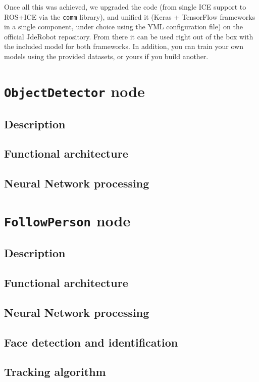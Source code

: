 					
					
					Once all this was achieved, we upgraded the code (from single ICE support to ROS+ICE via the \texttt{comm} library), and unified it (Keras + TensorFlow frameworks in a single component, under choice using the YML configuration file) on the official JdeRobot repository. From there it can be used right out of the box with the included model for both frameworks. In addition, you can train your own models using the provided datasets, or yours if you build another.
					


\chapter{\texttt{ObjectDetector} node}
\section{Description}
\section{Functional architecture}
\section{Neural Network processing}


\chapter{\texttt{FollowPerson} node}
\label{chap:followperson}
\section{Description}
\section{Functional architecture}
\section{Neural Network processing}
\section{Face detection and identification}
\section{Tracking algorithm}
